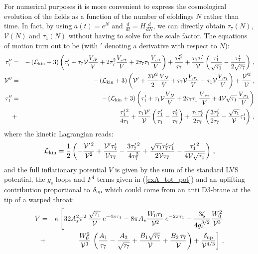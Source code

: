 \documentclass[11pt,a4paper]{article}
\newcommand{\bea}{\begin{eqnarray}}
\newcommand{\eea}{\end{eqnarray}}
\newcommand{\be}{\begin{equation}}
\newcommand{\ee}{\end{equation}}
\def\nn{\nonumber}
\newcommand\vo{{\mathcal{V}}}
\newcommand{\mc}{\mathcal}
\begin{document}
For numerical purposes it is more convenient to express the cosmological evolution of the fields as a function of the number of efoldings $N$ rather than time. In fact, by using $a(t)=e^N$ and $\frac{d}{dt}=H\frac{d}{dN}$, we can directly obtain $\tau_7 (N)$, $\vo(N)$ and $\tau_1(N)$ without having to solve for the scale factor. The equations of motion turn out to be (with $'$ denoting a derivative with respect to $N$):
\bea
\tau_7^{\prime \prime } &=&-\left( \mc{L}_{\rm kin}+3\right) \left(\tau_7^\prime +\tau_7\vo \frac{V_{,\vo}}{V}+2\tau_7^2 \frac{V_{,\tau_7}}{V}+2\tau_7\tau_1 \frac{V_{,\tau_1}}{V}\right) +\frac{\tau_7^{\prime 2}}{\tau_7}
+\frac{\tau_7 \tau_1^\prime}{\vo}\left(\frac{\tau_1^{\prime}}{\sqrt{\tau_1}} -\frac{\tau_7^\prime}{2\sqrt{\tau_7}}  \right)
\,, \nn \\
 \vo^{\prime \prime } &=&-\left( \mc{L}_{\rm kin}+3\right) \left( \vo^\prime +\frac{3\vo^2}{2}\frac{V_{,\vo}}{V}+\tau_7\vo\frac{V_{,\tau_7}}{V}+\tau_1\vo\frac{V_{,\tau_1}}{V}\right)
 +\frac{\vo^{\prime 2}}{\vo}\,, 
\label{NLEq} \\
\tau_1^{\prime \prime } &=& -\left( \mc{L}_{\rm kin}+3\right) \left(\tau_1^\prime +\tau_1\vo\frac{V_{,\vo}}{V}+ 2\tau_7\tau_1\,\frac{V_{,\tau_7}}{V}
+ 4\vo\sqrt{\tau_1}\,\frac{V_{,\tau_1}}{V}\right) \nn \\
&+& \frac{\tau_1^{\prime \,2}}{4\tau_1}
+ \frac{\tau_1 \vo^\prime}{\vo} \left( \frac{\tau_1^\prime}{\tau_1} - \frac{\tau_7^\prime}{\tau_7} \right) 
+\frac{\tau_1 \tau_7^\prime}{2\tau_7} \left(\frac{3 \tau_7^{\prime}}{2 \tau_7}
-\frac{\sqrt{\tau_1}}{\vo} \tau_1^\prime\right) \,,  \nn
\eea
where the kinetic Lagrangian reads:
\be
\mc{L}_{\rm kin} = \frac12 \left(-\frac{\vo^{\prime\,2}}{\vo^2} + \frac{\vo^\prime \tau_7^\prime}{\vo \tau_7 } - \frac{3 \tau_7^{\prime\,2}}{4 \tau_7^2} + \frac{\sqrt{\tau_1} \tau_7^\prime \tau_1^\prime}{ 2 \vo \tau_7} - \frac{\tau_1^{\prime\, 2}}{ 4 \vo \sqrt{\tau_1}}\right)\,,
\ee
and the full inflationary potential $V$ is given by the sum of the standard LVS potential, the $g_s$ loops and $F^4$ terms given in (\ref{exA_tot_pot}) and an uplifting contribution proportional to $\delta_{\rm up}$ which could come from an anti D3-brane at the tip of a warped throat:
\bea
V &=& \kappa \left[32 A_s^2 \pi^2\,\frac{\sqrt{\tau_1}}{\vo}\,e^{-4\pi\tau_1} - 8\pi A_s \frac{W_0 \tau_1}{\vo^2}\,e^{-2\pi\tau_1} + \frac{3\zeta}{4 g_s^{3/2}} \frac{W_0^2}{\vo^3} \right. \nn \\
&+& \left.  \frac{W_0^2}{\vo^3}\,\left(\frac{A_1}{\tau_7}-\frac{A_2}{\sqrt{\tau_7}}  + \frac{B_1\sqrt{\tau_7}}{\vo}+\frac{B_2 \,\tau_7}{\vo}\right)+\frac{\delta_{\rm up}}{\vo^{4/3}}\right]\,.
\label{Vinf}
\eea
\end{document}

